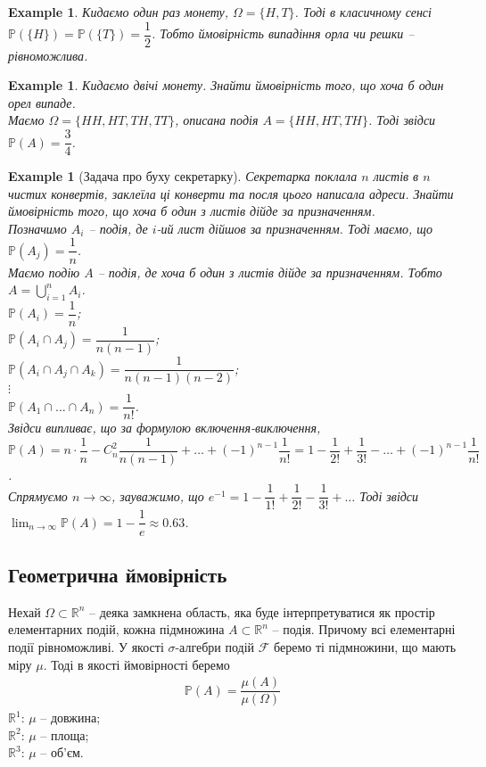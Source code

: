 \documentclass[a4paper, 10pt]{article}
\theoremstyle{theoremdd}
\newtheorem{example}[theorem]{Example}
\begin{document}
\begin{example}
Кидаємо один раз монету, $\Omega = \{H,T\}$. Тоді в класичному сенсі $\mathbb{P}(\{H\}) = \mathbb{P}(\{T\}) = \dfrac{1}{2}$. Тобто ймовірність випадіння орла чи решки -- рівноможлива.
\end{example}

\begin{example}
Кидаємо двічі монету. Знайти ймовірність того, що хоча б один орел випаде.\\
Маємо $\Omega = \{HH,HT,TH,TT\}$, описана подія $A = \{HH,HT,TH\}$. Тоді звідси $\mathbb{P}(A) = \dfrac{3}{4}$.
\end{example}

\begin{example}[Задача про буху секретарку]
Секретарка поклала $n$ листів в $n$ чистих конвертів, заклеїла ці конверти та посля цього написала адреси. Знайти ймовірність того, що хоча б один з листів дійде за призначенням.\\
Позначимо $A_i$ -- подія, де $i$-ий лист дійшов за призначенням. Тоді маємо, що $\mathbb{P}(A_j) = \dfrac{1}{n}$.\\
Маємо подію $A$ -- подія, де хоча б один з листів дійде за призначенням. Тобто $A = \displaystyle\bigcup_{i=1}^n A_i$.\\
$\mathbb{P}(A_i) = \dfrac{1}{n}$;\\
$\mathbb{P}(A_i \cap A_j) = \dfrac{1}{n(n-1)}$;\\
$\mathbb{P}(A_i \cap A_j \cap A_k) = \dfrac{1}{n(n-1)(n-2)}$;\\
$\vdots$\\
$\mathbb{P}(A_1 \cap \dots \cap A_n) = \dfrac{1}{n!}$.\\
Звідси випливає, що за формулою включення-виключення,\\
$\mathbb{P}(A) = n \cdot \dfrac{1}{n} - C_n^2 \dfrac{1}{n(n-1)} + \dots + (-1)^{n-1} \dfrac{1}{n!} = 1 - \dfrac{1}{2!} + \dfrac{1}{3!} - \dots + (-1)^{n-1} \dfrac{1}{n!}$.\\
Спрямуємо $n \to \infty$, зауважимо, що $e^{-1} = 1 - \dfrac{1}{1!} + \dfrac{1}{2!} - \dfrac{1}{3!} + \dots$ Тоді звідси $\displaystyle\lim_{n \to \infty} \mathbb{P}(A) = 1 - \dfrac{1}{e} \approx 0.63$.
\end{example}

\subsection{Геометрична ймовірність}
Нехай $\Omega \subset \mathbb{R}^n$ -- деяка замкнена область, яка буде інтерпретуватися як простір елементарних подій, кожна підмножина $A \subset \mathbb{R}^n$ -- подія. Причому всі елементарні події рівноможливі. У якості $\sigma$-алгебри подій $\mathcal{F}$ беремо ті підмножини, що мають міру $\mu$. Тоді в якості ймовірності беремо
\begin{align*}
\mathbb{P}(A) = \dfrac{\mu(A)}{\mu(\Omega)}
\end{align*}
\noindent
$\mathbb{R}^1$: $\mu$ -- довжина;\\
$\mathbb{R}^2$: $\mu$ -- площа;\\
$\mathbb{R}^3$: $\mu$ -- об'єм.
\end{document}
